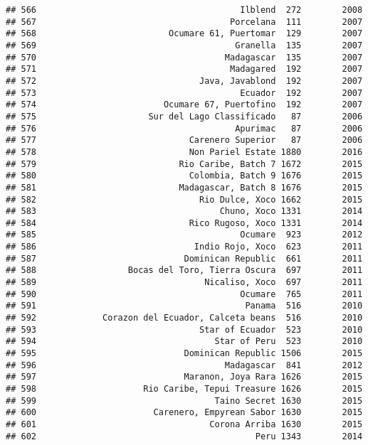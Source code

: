 \documentclass[
]{article}
\begin{document}
\begin{verbatim}
## 566                                        Ilblend  272        2008
## 567                                      Porcelana  111        2007
## 568                          Ocumare 61, Puertomar  129        2007
## 569                                       Granella  135        2007
## 570                                     Madagascar  135        2007
## 571                                      Madagared  192        2007
## 572                                Java, Javablond  192        2007
## 573                                        Ecuador  192        2007
## 574                         Ocumare 67, Puertofino  192        2007
## 575                      Sur del Lago Classificado   87        2006
## 576                                       Apurimac   87        2006
## 577                              Carenero Superior   87        2006
## 578                              Non Pariel Estate 1880        2016
## 579                            Rio Caribe, Batch 7 1672        2015
## 580                              Colombia, Batch 9 1676        2015
## 581                            Madagascar, Batch 8 1676        2015
## 582                                Rio Dulce, Xoco 1662        2015
## 583                                    Chuno, Xoco 1331        2014
## 584                              Rico Rugoso, Xoco 1331        2014
## 585                                        Ocumare  923        2012
## 586                               Indio Rojo, Xoco  623        2011
## 587                             Dominican Republic  661        2011
## 588                  Bocas del Toro, Tierra Oscura  697        2011
## 589                                 Nicaliso, Xoco  697        2011
## 590                                        Ocumare  765        2011
## 591                                         Panama  516        2010
## 592             Corazon del Ecuador, Calceta beans  516        2010
## 593                                Star of Ecuador  523        2010
## 594                                   Star of Peru  523        2010
## 595                             Dominican Republic 1506        2015
## 596                                     Madagascar  841        2012
## 597                             Maranon, Joya Rara 1626        2015
## 598                     Rio Caribe, Tepui Treasure 1626        2015
## 599                                   Taino Secret 1630        2015
## 600                       Carenero, Empyrean Sabor 1630        2015
## 601                                  Corona Arriba 1630        2015
## 602                                           Peru 1343        2014

\end{verbatim}
\end{document}
